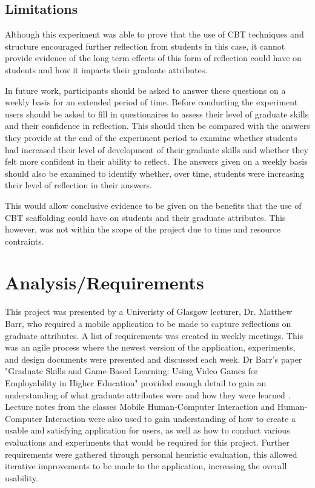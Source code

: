 \documentclass{l4proj}
\begin{document}
\section{Limitations}

Although this experiment was able to prove that the use of CBT techniques and structure encouraged further reflection from students in this case, it cannot provide evidence of the long term effects of this form of reflection could have on students and how it impacts their graduate attributes. 

In future work, participants should be asked to answer these questions on a weekly basis for an extended period of time. Before conducting the experiment users should be asked to fill in questionaires to assess their level of graduate skills and their confidence in reflection. This should then be compared with the answers they provide at the end of the experiment period to examine whether students had increased their level of development of their graduate skills and whether they felt more confident in their ability to reflect. The answers given on a weekly basis should also be examined to identify whether, over time, students were increasing their level of reflection in their answers. 

This would allow conclusive evidence to be given on the benefits that the use of CBT scaffolding could have on students and their graduate attributes. This however, was not within the scope of the project due to time and resource contraints. 



\chapter{Analysis/Requirements}

This project was presented by a Univeristy of Glasgow lecturer, Dr. Matthew Barr, who required a mobile application to be made to capture reflections on graduate attributes. A list of requirements was created in weekly meetings. This was an agile process where the newest version of the application, experiments, and design documents were presented and discussed each week. Dr Barr's paper "Graduate Skills and Game-Based Learning: Using Video Games for Employability in Higher Education" provided enough detail to gain an understanding of what graduate attributes were and how they were learned \citep{barr_2019}. Lecture notes from the classes Mobile Human-Computer Interaction and Human-Computer Interaction were also used to gain understanding of how to create a usable and satisfying application for users, as well as how to conduct various evaluations and experiments that would be required for this project. Further requirements were gathered through personal heuristic evaluation, this allowed iterative improvements to be made to the application, increasing the overall usability.
\end{document}
